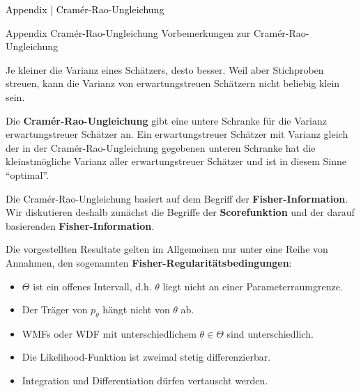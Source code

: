 \documentclass[
  8pt,
  ignorenonframetext,
]{beamer}
\providecommand{\tightlist}{%
  \setlength{\itemsep}{0pt}\setlength{\parskip}{0pt}}
\begin{document}
\begin{frame}[plain]{}
\protect\hypertarget{section-15}{}
\vfill
\center
\huge

\textcolor{black}{Appendix | Cramér-Rao-Ungleichung} \vfill
\end{frame}

\begin{frame}{Appendix \textbar{} Cramér-Rao-Ungleichung}
\protect\hypertarget{appendix-cramuxe9r-rao-ungleichung}{}
Vorbemerkungen zur Cramér-Rao-Ungleichung

\small

Je kleiner die Varianz eines Schätzers, desto besser. Weil aber
Stichproben streuen, kann die Varianz von erwartungstreuen Schätzern
nicht beliebig klein sein. \vspace{2mm}

Die \textbf{Cramér-Rao-Ungleichung} gibt eine untere Schranke für die
Varianz erwartungstreuer Schätzer an. Ein erwartungstreuer Schätzer mit
Varianz gleich der in der Cramér-Rao-Ungleichung gegebenen unteren
Schranke hat die kleinstmögliche Varianz aller erwartungstreuer Schätzer
und ist in diesem Sinne ``optimal''. \vspace{2mm}

Die Cramér-Rao-Ungleichung basiert auf dem Begriff der
\textbf{Fisher-Information}. Wir diskutieren deshalb zunächst die
Begriffe der \textbf{Scorefunktion} und der darauf basierenden
\textbf{Fisher-Information}. \vspace{2mm}

Die vorgestellten Resultate gelten im Allgemeinen nur unter eine Reihe
von Annahmen, den sogenannten \textbf{Fisher-Regularitätsbedingungen}:

\footnotesize

\begin{itemize}
\tightlist
\item
  \(\Theta\) ist ein offenes Intervall, d.h. \(\theta\) liegt nicht an
  einer Parameterraumgrenze.
\item
  Der Träger von \(p_\theta\) hängt nicht von \(\theta\) ab.
\item
  WMFs oder WDF mit unterschiedlichem \(\theta \in \Theta\) sind
  unterschiedlich.
\item
  Die Likelihood-Funktion ist zweimal stetig differenzierbar.
\item
  Integration und Differentiation dürfen vertauscht werden.
\end{itemize}
\end{frame}
\end{document}
